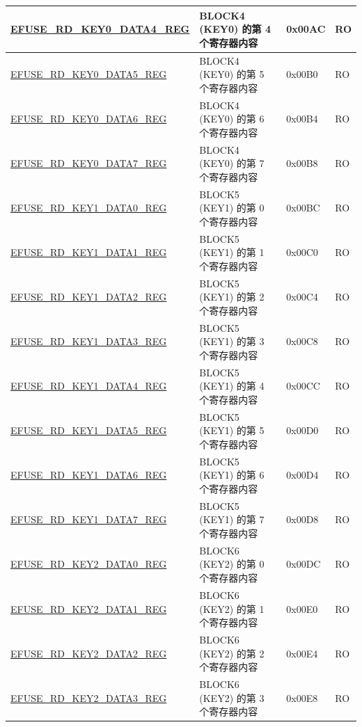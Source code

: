 \begin{longtable}{ | p{6.8cm} | p{7cm} | p{1.3cm} | p{1.2cm} | }
    \hyperref[regdesc:EFUSERDKEY0DATANREG]{EFUSE\_RD\_KEY0\_DATA4\_REG} & BLOCK4 (KEY0) 的第 4 个寄存器内容 & 0x00AC & RO \\ \hline
    \hyperref[regdesc:EFUSERDKEY0DATANREG]{EFUSE\_RD\_KEY0\_DATA5\_REG} & BLOCK4 (KEY0) 的第 5 个寄存器内容 & 0x00B0 & RO \\ \hline
    \hyperref[regdesc:EFUSERDKEY0DATANREG]{EFUSE\_RD\_KEY0\_DATA6\_REG} & BLOCK4 (KEY0) 的第 6 个寄存器内容 & 0x00B4 & RO \\ \hline
    \hyperref[regdesc:EFUSERDKEY0DATANREG]{EFUSE\_RD\_KEY0\_DATA7\_REG} & BLOCK4 (KEY0) 的第 7 个寄存器内容 & 0x00B8 & RO \\ \hline
    \hyperref[regdesc:EFUSERDKEY1DATANREG]{EFUSE\_RD\_KEY1\_DATA0\_REG} & BLOCK5 (KEY1) 的第 0 个寄存器内容 & 0x00BC & RO \\ \hline
    \hyperref[regdesc:EFUSERDKEY1DATANREG]{EFUSE\_RD\_KEY1\_DATA1\_REG} & BLOCK5 (KEY1) 的第 1 个寄存器内容 & 0x00C0 & RO \\ \hline
    \hyperref[regdesc:EFUSERDKEY1DATANREG]{EFUSE\_RD\_KEY1\_DATA2\_REG} & BLOCK5 (KEY1) 的第 2 个寄存器内容 & 0x00C4 & RO \\ \hline
    \hyperref[regdesc:EFUSERDKEY1DATANREG]{EFUSE\_RD\_KEY1\_DATA3\_REG} & BLOCK5 (KEY1) 的第 3 个寄存器内容 & 0x00C8 & RO \\ \hline
    \hyperref[regdesc:EFUSERDKEY1DATANREG]{EFUSE\_RD\_KEY1\_DATA4\_REG} & BLOCK5 (KEY1) 的第 4 个寄存器内容 & 0x00CC & RO \\ \hline
    \hyperref[regdesc:EFUSERDKEY1DATANREG]{EFUSE\_RD\_KEY1\_DATA5\_REG} & BLOCK5 (KEY1) 的第 5 个寄存器内容 & 0x00D0 & RO \\ \hline
    \hyperref[regdesc:EFUSERDKEY1DATANREG]{EFUSE\_RD\_KEY1\_DATA6\_REG} & BLOCK5 (KEY1) 的第 6 个寄存器内容 & 0x00D4 & RO \\ \hline
    \hyperref[regdesc:EFUSERDKEY1DATANREG]{EFUSE\_RD\_KEY1\_DATA7\_REG} & BLOCK5 (KEY1) 的第 7 个寄存器内容 & 0x00D8 & RO \\ \hline
    \hyperref[regdesc:EFUSERDKEY2DATANREG]{EFUSE\_RD\_KEY2\_DATA0\_REG} & BLOCK6 (KEY2) 的第 0 个寄存器内容 & 0x00DC & RO \\ \hline
    \hyperref[regdesc:EFUSERDKEY2DATANREG]{EFUSE\_RD\_KEY2\_DATA1\_REG} & BLOCK6 (KEY2) 的第 1 个寄存器内容 & 0x00E0 & RO \\ \hline
    \hyperref[regdesc:EFUSERDKEY2DATANREG]{EFUSE\_RD\_KEY2\_DATA2\_REG} & BLOCK6 (KEY2) 的第 2 个寄存器内容 & 0x00E4 & RO \\ \hline
    \hyperref[regdesc:EFUSERDKEY2DATANREG]{EFUSE\_RD\_KEY2\_DATA3\_REG} & BLOCK6 (KEY2) 的第 3 个寄存器内容 & 0x00E8 & RO \\ \hline

\end{longtable}
